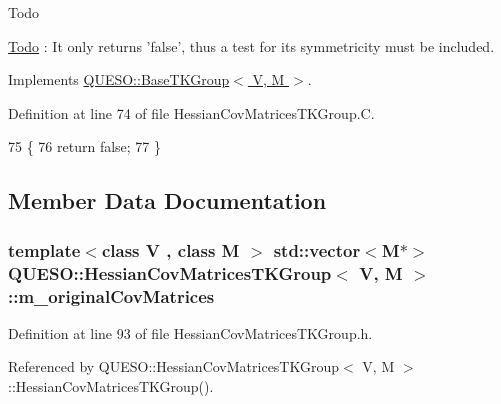 \begin{DoxyRefDesc}{Todo}
\item[\hyperlink{todo__todo000032}{Todo}]\-: It only returns 'false', thus a test for its symmetricity must be included. \end{DoxyRefDesc}


Implements \hyperlink{class_q_u_e_s_o_1_1_base_t_k_group_ad0130349060d50b985c83b6bb1abc58e}{Q\-U\-E\-S\-O\-::\-Base\-T\-K\-Group$<$ V, M $>$}.



Definition at line 74 of file Hessian\-Cov\-Matrices\-T\-K\-Group.\-C.


\begin{DoxyCode}
75 \{
76   \textcolor{keywordflow}{return} \textcolor{keyword}{false};
77 \}
\end{DoxyCode}


\subsection{Member Data Documentation}
\hypertarget{class_q_u_e_s_o_1_1_hessian_cov_matrices_t_k_group_acc7219917faf933e77694894856fa646}{
\subsubsection[{m\-\_\-original\-Cov\-Matrices}]{\setlength{\rightskip}{0pt plus 5cm}template$<$class V , class M $>$ std\-::vector$<$M$\ast$$>$ {\bf Q\-U\-E\-S\-O\-::\-Hessian\-Cov\-Matrices\-T\-K\-Group}$<$ V, M $>$\-::m\-\_\-original\-Cov\-Matrices\hspace{0.3cm}{\ttfamily [private]}}}\label{class_q_u_e_s_o_1_1_hessian_cov_matrices_t_k_group_acc7219917faf933e77694894856fa646}


Definition at line 93 of file Hessian\-Cov\-Matrices\-T\-K\-Group.\-h.



Referenced by Q\-U\-E\-S\-O\-::\-Hessian\-Cov\-Matrices\-T\-K\-Group$<$ V, M $>$\-::\-Hessian\-Cov\-Matrices\-T\-K\-Group().

